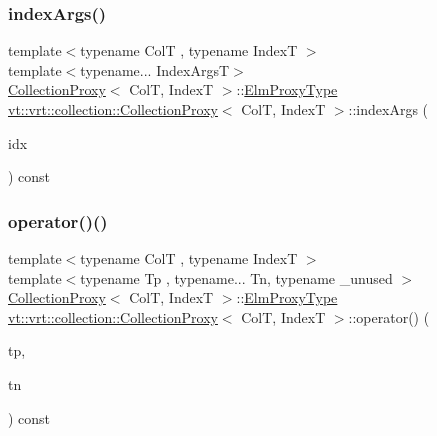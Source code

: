 \mbox{\label{structvt_1_1vrt_1_1collection_1_1_collection_proxy_a0119b05e9284408d0b6dfc8fc47b12d6}} 
\subsubsection{\texorpdfstring{index\+Args()}{indexArgs()}}
{\footnotesize\ttfamily template$<$typename ColT , typename IndexT $>$ \\
template$<$typename... Index\+ArgsT$>$ \\
\hyperlink{structvt_1_1vrt_1_1collection_1_1_collection_proxy}{Collection\+Proxy}$<$ ColT, IndexT $>$\+::\hyperlink{structvt_1_1vrt_1_1collection_1_1_collection_proxy_a892c21eae1dca37321d7973f72b55b0a}{Elm\+Proxy\+Type} \hyperlink{structvt_1_1vrt_1_1collection_1_1_collection_proxy}{vt\+::vrt\+::collection\+::\+Collection\+Proxy}$<$ ColT, IndexT $>$\+::index\+Args (\begin{DoxyParamCaption}\item[{Index\+ArgsT \&\&...}]{idx }\end{DoxyParamCaption}) const}

\mbox{\label{structvt_1_1vrt_1_1collection_1_1_collection_proxy_a8a06bed8946060c4d1e11f665e05e64f}} 
\subsubsection{\texorpdfstring{operator()()}{operator()()}\hspace{0.1cm}{\footnotesize\ttfamily [1/2]}}
{\footnotesize\ttfamily template$<$typename ColT , typename IndexT $>$ \\
template$<$typename Tp , typename... Tn, typename \+\_\+unused $>$ \\
\hyperlink{structvt_1_1vrt_1_1collection_1_1_collection_proxy}{Collection\+Proxy}$<$ ColT, IndexT $>$\+::\hyperlink{structvt_1_1vrt_1_1collection_1_1_collection_proxy_a892c21eae1dca37321d7973f72b55b0a}{Elm\+Proxy\+Type} \hyperlink{structvt_1_1vrt_1_1collection_1_1_collection_proxy}{vt\+::vrt\+::collection\+::\+Collection\+Proxy}$<$ ColT, IndexT $>$\+::operator() (\begin{DoxyParamCaption}\item[{Tp \&\&}]{tp,  }\item[{Tn \&\&...}]{tn }\end{DoxyParamCaption}) const}

